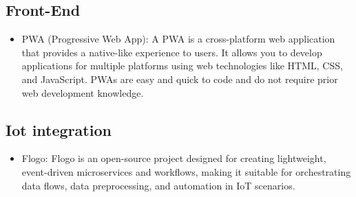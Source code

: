 \documentclass[12pt]{article}
\begin{document}
\subsection{Front-End}
\begin{itemize}
    \item PWA (Progressive Web App): A PWA is a cross-platform web application that provides a native-like experience to users. It allows you to develop applications for multiple platforms using web technologies like HTML, CSS, and JavaScript. PWAs are easy and quick to code and do not require prior web development knowledge.
\end{itemize}
\subsection{Iot integration}
\begin{itemize}
    \item Flogo: Flogo is an open-source project designed for creating lightweight, event-driven microservices and workflows, making it suitable for orchestrating data flows, data preprocessing, and automation in IoT scenarios.
\end{itemize}
\end{document}
